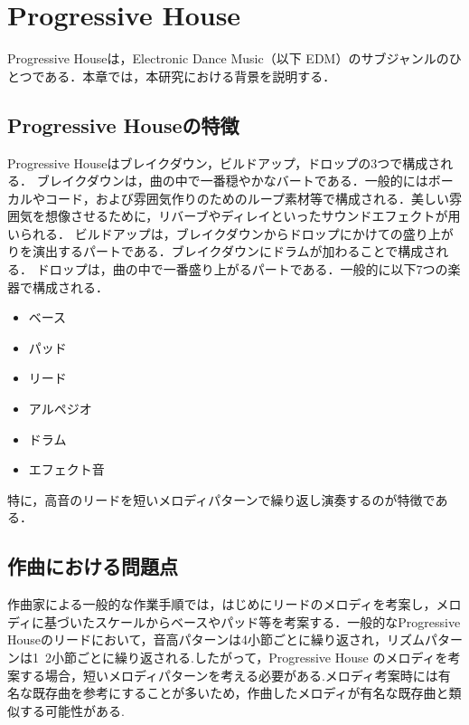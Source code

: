 \chapter{Progressive House}
Progressive Houseは，Electronic Dance Music（以下 EDM）のサブジャンルのひとつである．本章では，本研究における背景を説明する．

\section{Progressive Houseの特徴}
Progressive Houseはブレイクダウン，ビルドアップ，ドロップの3つで構成される．
ブレイクダウンは，曲の中で一番穏やかなバートである．一般的にはボーカルやコード，および雰囲気作りのためのループ素材等で構成される．美しい雰囲気を想像させるために，リバーブやディレイといったサウンドエフェクトが用いられる．
ビルドアップは，ブレイクダウンからドロップにかけての盛り上がりを演出するパートである．ブレイクダウンにドラムが加わることで構成される．
ドロップは，曲の中で一番盛り上がるパートである．一般的に以下7つの楽器で構成される．
\begin{itemize}
  \item ベース
  \item パッド
  \item リード
  \item アルペジオ
  \item ドラム
  \item エフェクト音
\end{itemize}
特に，高音のリードを短いメロディパターンで繰り返し演奏するのが特徴である．

\section{作曲における問題点}
作曲家による一般的な作業手順では，はじめにリードのメロディを考案し，メロディに基づいたスケールからベースやパッド等を考案する．一般的なProgressive Houseのリードにおいて，音高パターンは4小節ごとに繰り返され，リズムパターンは1~2小節ごとに繰り返される.したがって，Progressive House のメロディを考案する場合，短いメロディパターンを考える必要がある.メロディ考案時には有名な既存曲を参考にすることが多いため，作曲したメロディが有名な既存曲と類似する可能性がある.
